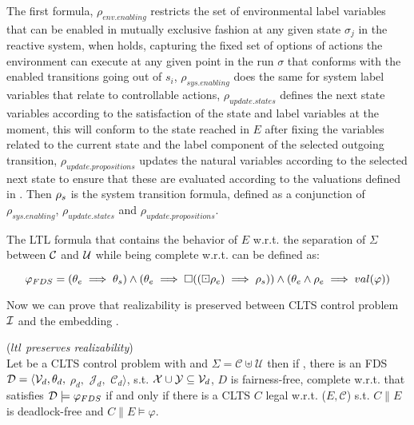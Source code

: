 The first formula, $\rho_{env.enabling}$ restricts the set of environmental label variables that can be enabled in mutually exclusive fashion at any given state $\sigma_j$ in the reactive system, when  holds, capturing the fixed set of options of actions the environment can execute at any given point in the run $\sigma$ that conforms with the enabled transitions going out of $s_i$, $\rho_{sys.enabling}$ does the same for system label variables that relate to controllable actions, $\rho_{update.states}$ defines the next state variables according to the satisfaction of the state and label variables at the moment, this will conform to the state reached in $E$ after fixing the variables related to the current state and the label component of the selected outgoing transition, $\rho_{update.propositions}$ updates the natural variables according to the selected next state to ensure that these are evaluated according to the valuations defined in \valuations. Then ${\rho_s}$ is the system transition formula, defined as a conjunction of $\rho_{sys.enabling}$, $\rho_{update.states}$ and $\rho_{update.propositions}$.
%
%


The LTL formula that contains the behavior of $E$ w.r.t. the separation of $\Sigma$ between $\mathcal{C}$ and $\mathcal{U}$ while being complete w.r.t. \gsX can be defined as:

\[ \varphi_{FDS} = (\theta_e \implies \theta_s) \wedge (\theta_e \implies \square((\boxdot \rho_e) \implies \rho_s)) \wedge (\theta_e \wedge \rho_e \implies val(\varphi)) \]

Now we can prove that realizability is preserved between CLTS control problem $\mathcal{I}$ and the embedding \fdsEmbedding.

\begin{theorem}(\emph{$ltl$ preserves realizability})\label{theorem:gs_preserves_realizability}\\
	Let \controlProblemDef be a CLTS control problem with \cltsDef and $\Sigma = \mathcal{C}\uplus \mathcal{U}$ then if \fdsEmbeddingDef, there is an FDS $\mathcal{D}= \langle \mathcal{V}_d, \theta_d,$ $\rho_d,$ $\mathcal{J}_d,$ $\mathcal{C}_d\rangle$, s.t. ${\mathcal{X}} \cup {\ensuremath{\mathcal{Y}}} \subseteq \mathcal{V}_d$, $D$ is fairness-free, complete w.r.t. \gsX that satisfies $\mathcal{D} \models \varphi_{FDS}$
	if and only if there is a CLTS $C$ legal w.r.t. ($E,\mathcal{C}$) s.t. $C \parallel E$ is deadlock-free and $C \parallel E \models \varphi$.
	\normalsize
\end{theorem}

